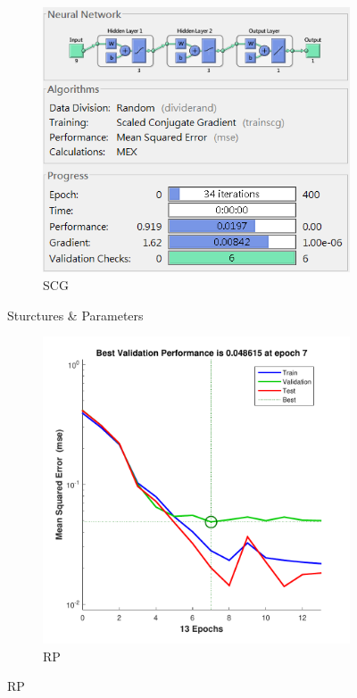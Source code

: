 \documentclass[12pt,a4paper]{article}
\begin{document}
\begin{CJK}{UTF8}{bsmi}
\begin{enumerate}
\begin{enumerate}
\begin{figure}[H]
\begin{subfigure}{.5\textwidth}
	 		\end{subfigure}%
	 		\begin{subfigure}{.5\textwidth}
	 			\centering
	 			\includegraphics[width=0.92\linewidth]{SCG3}
	 			\caption{SCG}
	 			
	 		\end{subfigure}
	 		\caption{Sturctures \& Parameters}
	 		
	 	\end{figure}
	 	
	 	
	 	\begin{figure}[H]
	 		\centering
	 		\begin{subfigure}{.5\textwidth}
	 			\centering
	 			\includegraphics[width=1\linewidth]{breast_rp_per}
	 			\caption{RP}
	 			

\end{subfigure}
\end{figure}
\end{enumerate}
\end{enumerate}
\end{CJK}
\end{document}

